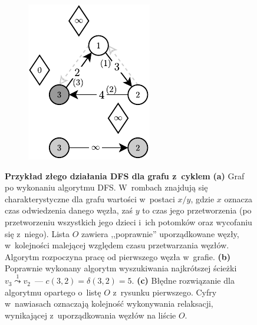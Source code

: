 \begin{figure}[!htbp]
\begin{subfigure}[b]{0.18\textwidth}
		\caption{}
	\end{subfigure}
	\qquad \qquad
	\begin{subfigure}[b]{0.18\textwidth}
		\includegraphics[width=\textwidth]{Chapter_II/BFS-TOPOLOGICAL-SORT-Example/c.pdf}
		\caption{}
	\end{subfigure}
	\caption{\textbf{Przykład złego działania \textsf{DFS} dla grafu z~cyklem} \textbf{(a)} Graf po wykonaniu algorytmu \textsf{DFS}. W~rombach znajdują się charakterystyczne dla grafu wartości w~postaci $x/y$, gdzie $x$ oznacza czas odwiedzenia danego węzła, zaś $y$ to czas jego przetworzenia (po przetworzeniu wszystkich jego dzieci i~ich potomków oraz wycofaniu się z~niego). Lista $O$ zawiera ,,poprawnie'' uporządkowane węzły, w~kolejności malejącej względem czasu przetwarzania węzłów. Algorytm rozpoczyna pracę od pierwszego węzła w~grafie. \textbf{(b)} Poprawnie wykonany algorytm wyszukiwania najkrótszej ścieżki $v_{3} \overset{1} \leadsto v_{2}$~--- $c \left( 3, 2 \right) = \delta \left( 3, 2 \right) = 5$. \textbf{(c)} Błędne rozwiązanie dla algorytmu opartego o~listę $O$ z~rysunku pierwszego. Cyfry w~nawiasach oznaczają kolejność wykonywania relaksacji, wynikającej z~uporządkowania węzłów na liście $O$.} \label{fig:exampleDFS}
\end{figure}

